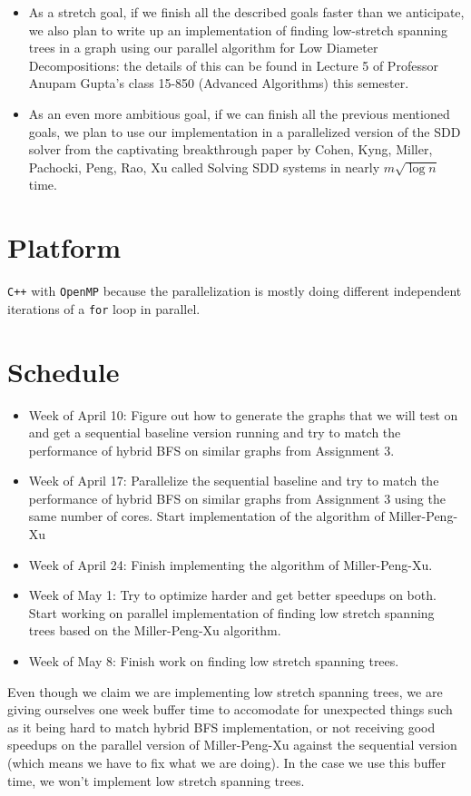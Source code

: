 \documentclass[11pt]{scrartcl}
\theoremstyle{plain}
\theoremstyle{definition}
\theoremstyle{remark}
\begin{document}
\begin{itemize}
\item As a stretch goal, if we finish all the described goals faster than we anticipate, we also
plan to write up an implementation of finding low-stretch spanning trees in a graph using
our parallel algorithm for Low Diameter Decompositions: the details of this can be found in
Lecture 5 of Professor Anupam Gupta's class 15-850 (Advanced Algorithms) this semester.

\item As an even more ambitious goal, if we can finish all the previous mentioned goals, we plan to
use our implementation in a parallelized version of the SDD solver from the
captivating breakthrough paper by Cohen, Kyng, Miller, Pachocki, Peng, Rao, Xu called
Solving SDD systems in nearly $m\sqrt{\log{n}}$ time.

\end{itemize}

\section{Platform}
\texttt{C++} with \texttt{OpenMP} because the parallelization is mostly
doing different independent iterations of a \texttt{for} loop in parallel.


\section{Schedule}
\begin{itemize}
\item Week of April 10: Figure out how to generate the graphs that we will test on and get a
sequential baseline version running and try to match the performance of hybrid BFS on similar
graphs from Assignment 3.

\item Week of April 17: Parallelize the sequential baseline and try to match the
performance of hybrid BFS on similar graphs from Assignment 3 using the same number of cores.
Start implementation of the algorithm of Miller-Peng-Xu

\item Week of April 24: Finish implementing the algorithm of Miller-Peng-Xu.

\item Week of May 1: Try to optimize harder and get better speedups on both. Start
working on parallel implementation of finding low stretch spanning trees based on
the Miller-Peng-Xu algorithm.

\item Week of May 8: Finish work on finding low stretch spanning trees.

\end{itemize}

Even though we claim we are implementing low stretch spanning trees, we are giving ourselves one week buffer
time to accomodate for unexpected things such as it being hard to match hybrid BFS implementation,
or not receiving good speedups on the parallel version of Miller-Peng-Xu against the sequential
version (which means we have to fix what we are doing). In the case we use this buffer time,
we won't implement low stretch spanning trees. 
\end{document}
